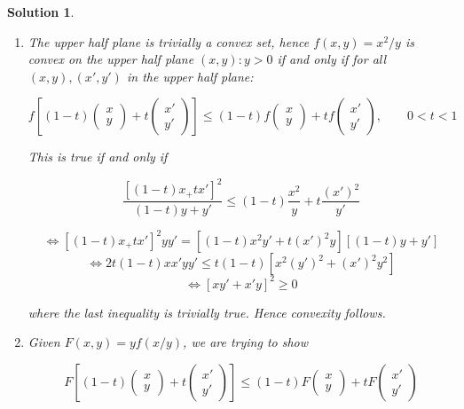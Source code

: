 \documentclass[a4paper]{article}
\newtheorem*{soln}{Solution}
\begin{document}
\begin{soln}
\begin{enumerate}
	\item The upper half plane is trivially a convex set, hence $ f(x,y) = x^{2} / y $ is convex on the upper half plane $ (x,y) : y > 0 $ if and only if for all $ (x,y), (x',y') $ in the upper half plane:
	
	\[ f \left[ (1 - t) \begin{pmatrix}
	x \\
	y
	\end{pmatrix}  + t \begin{pmatrix}
	x' \\
	y'
	\end{pmatrix} \right] \leq (1-t) f \begin{pmatrix}
	x \\
	y
	\end{pmatrix} + t f\begin{pmatrix}
	x' \\
	y'
	\end{pmatrix}, \qquad 0 < t < 1 \]
	
	This is true if and only if
	
	\[ \frac{[ (1 - t)x_ + t x' ]^{2}}{(1-t)y + y'} \leq (1-t) \frac{x^{2}}{y} + t \frac{(x')^{2}}{y'} \]
	
	\[ \iff [ (1 - t)x_ + t x' ]^{2}y y' = [(1-t) x^{2}y' + t(x')^{2}y][(1-t)y + y']  \]
	\[ \iff 2t(1-t) xx'yy' \leq t(1-t)\left[ x^{2}(y')^{2} +  (x')^{2}y^{2}\right]  \]
	\[ \iff \left[  xy' + x'y \right]^{2} \geq 0 \]
	
	where the last inequality is trivially true. Hence convexity follows.
	
	\item Given $ F(x,y) = y f(x/y) $, we are trying to show
	
	\[ F \left[  (1-t) \begin{pmatrix}
	x\\
	y
	\end{pmatrix} + t \begin{pmatrix}
	x' \\
	y'
	\end{pmatrix} \right] \leq (1-t) F \begin{pmatrix}
	x\\
	y
	\end{pmatrix} + t F \begin{pmatrix}
	x'\\
	y'
	\end{pmatrix} \]
	

\end{enumerate}
\end{soln}
\end{document}
